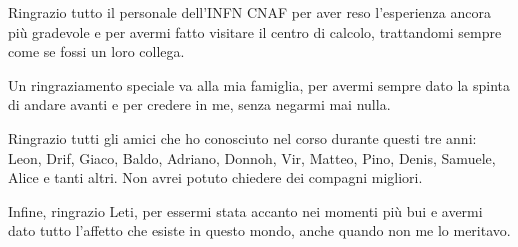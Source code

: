 \documentclass[12pt,a4paper,openright,twoside]{report}
\begin{document}
Ringrazio tutto il personale dell'INFN CNAF per aver reso l'esperienza ancora più gradevole e per avermi fatto visitare il centro di calcolo, trattandomi sempre come se fossi un loro collega.  

Un ringraziamento speciale va alla mia famiglia, per avermi sempre dato la spinta di andare avanti e per credere in me, senza negarmi mai nulla. 

Ringrazio tutti gli amici che ho conosciuto nel corso durante questi tre anni: Leon, Drif, Giaco, Baldo, Adriano, Donnoh, Vir, Matteo, Pino, Denis, Samuele, Alice e tanti altri. Non avrei potuto chiedere dei compagni migliori. 


Infine, ringrazio Leti, per essermi stata accanto nei momenti più bui e avermi dato tutto l'affetto che esiste in questo mondo, anche quando non me lo meritavo.  
\end{document}
